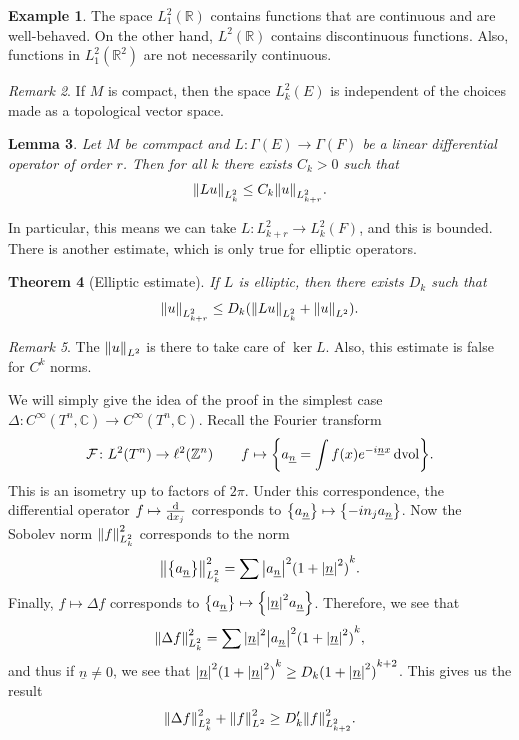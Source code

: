 \documentclass[leqno, openany]{memoir}
\newtheorem{thm}{Theorem}[section]
\newtheorem{lem}[thm]{Lemma}
\theoremstyle{definition}
\newtheorem{exm}[thm]{Example}
\theoremstyle{remark}
\newtheorem{rmk}[thm]{Remark}
\theoremstyle{plain}
\theoremstyle{definition}
\theoremstyle{remark}
\newcommand{\R}{\mathbb{R}}
\newcommand{\C}{\mathbb{C}}
\newcommand{\Z}{\mathbb{Z}}
\newcommand{\mc}[1]{\mathcal{#1}}
\newcommand{\mr}[1]{\mathrm{#1}}
\newcommand{\ul}[1]{\underline{#1}}
\begin{document}
\begin{exm}
    The space $L_1^2(\R)$ contains functions that are continuous and are well-behaved. On the other hand, $L^2(\R)$ contains discontinuous functions. Also, functions in $L_1^2(\R^2)$ are not necessarily continuous.
\end{exm}

\begin{rmk}
    If $M$ is compact, then the space $L_k^2(E)$ is independent of the choices made as a topological vector space.
\end{rmk}

\begin{lem}
    Let $M$ be commpact and $L \colon \Gamma(E) \to \Gamma(F)$ be a linear differential operator of order $r$. Then for all $k$ there exists $C_k > 0$ such that
    \[ \norm{L u}_{L^2_k} \leq C_k \norm{u}_{L^2_{k+r}}. \]
\end{lem}

In particular, this means we can take $L \colon L_{k+r}^2 \to L_k^2(F)$, and this is bounded. There is another estimate, which is only true for elliptic operators.

\begin{thm}[Elliptic estimate]
    If $L$ is elliptic, then there exists $D_k$ such that 
    \[ \norm{u}_{L^2_{k+r}} \leq D_k (\norm{Lu}_{L^2_k} + \norm{u}_{L^2}). \]
\end{thm}

\begin{rmk}
    The $\norm{u}_{L^2}$ is there to take care of $\ker L$. Also, this estimate is false for $C^k$ norms.
\end{rmk}

We will simply give the idea of the proof in the simplest case $\Delta \colon C^{\infty}(T^n, \C) \to C^{\infty}(T^n, \C)$. Recall the Fourier transform
\[ \mc{F} \colon L^2(T^n) \to \ell^2(\Z^n) \qquad f \mapsto \qty{a_{\ul{n}} = \int f(x) e^{-i \ul{n} x} \dd{\mr{vol}}}. \]
This is an isometry up to factors of $2 \pi$. Under this correspondence, the differential operator $f \mapsto \dv{x_j}$ corresponds to $\qty{a_{\ul{n}}} \mapsto \qty{-i n_j a_{\ul{n}}}$. Now the Sobolev norm $\norm{f}_{L^2_k}^2$ corresponds to the norm
\[ \norm{\qty{a_{\ul{n}}}}_{L^2_k}^2 = \sum \abs{a_{\ul{n}}}^2 {(1 + \abs{\ul{n}}^2)}^k. \]
Finally, $f \mapsto \Delta f$ corresponds to $\qty{a_{\ul{n}}} \mapsto \qty{\abs{\ul{n}}^2 a_{\ul{n}}}$. Therefore, we see that
\[ \norm{\Delta f}_{L^2_k}^2 = \sum \abs{\ul{n}}^2 \abs{a_{\ul{n}}}^2 {(1 + \abs{\ul{n}}^2)}^k, \]
and thus if $\ul{n} \neq 0$, we see that $\abs{\ul{n}}^2 {(1 + \abs{\ul{n}}^2)}^k \geq D_k {(1+\abs{\ul{n}}^2)}^{k+2}$. This gives us the result
\[ \norm{\Delta f}^2_{L^2_k} + \norm{f}_{L^2}^2 \geq D_k' \norm{f}_{L^2_{k+2}}^2. \]
\end{document}
